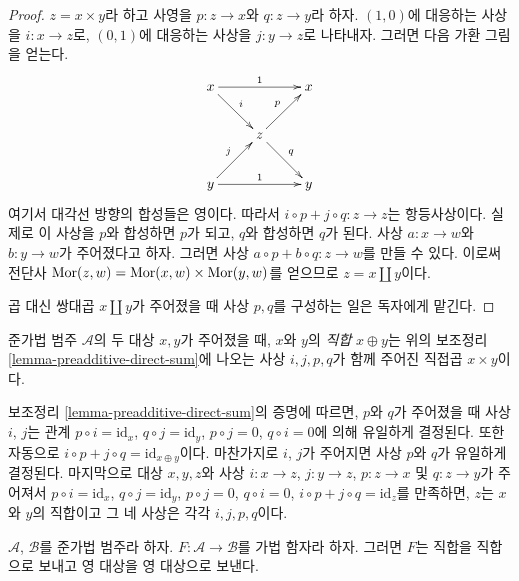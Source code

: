 \begin{proof}
$z = x \times y$라 하고 사영을 $p : z \to x$와 $q : z \to y$라 하자.
$(1, 0)$에 대응하는 사상을 $i : x \to z$로, $(0, 1)$에 대응하는 사상을
$j : y \to z$로 나타내자. 그러면 다음 가환 그림을 얻는다.
$$
\xymatrix{
x \ar[rr]^1 \ar[rd]^i & & x \\
& z \ar[ru]^p \ar[rd]^q & \\
y \ar[rr]^1 \ar[ru]^j & & y
}
$$
여기서 대각선 방향의 합성들은 영이다. 따라서
$i \circ p + j \circ q : z \to z$는 항등사상이다. 실제로 이 사상을
$p$와 합성하면 $p$가 되고, $q$와 합성하면 $q$가 된다.
사상 $a : x \to w$와 $b : y \to w$가 주어졌다고 하자.
그러면 사상 $a \circ p + b \circ q : z \to w$를 만들 수 있다.
이로써 전단사 $\mathop{\mathrm{Mor}}\nolimits(z, w) = \mathop{\mathrm{Mor}}\nolimits(x, w) \times \mathop{\mathrm{Mor}}\nolimits(y, w)$를 얻으므로
$z = x \amalg y$이다.

\medskip\noindent
곱 대신 쌍대곱 $x \amalg y$가 주어졌을 때 사상 $p, q$를 구성하는 일은
독자에게 맡긴다.
\end{proof}

\begin{definition}
\label{definition-direct-sum}
준가법 범주 $\mathcal{A}$의 두 대상 $x, y$가 주어졌을 때, $x$와 $y$의
{\it 직합} $x \oplus y$는 위의 보조정리
\ref{lemma-preadditive-direct-sum}에 나오는 사상 $i, j, p, q$가 함께 주어진
직접곱 $x \times y$이다.
\end{definition}

\begin{remark}
\label{remark-direct-sum}
보조정리 \ref{lemma-preadditive-direct-sum}의 증명에 따르면, $p$와 $q$가
주어졌을 때 사상 $i$, $j$는 관계 $p \circ i = \text{id}_x$,
$q \circ j = \text{id}_y$, $p \circ j = 0$, $q \circ i = 0$에 의해
유일하게 결정된다. 또한 자동으로
$i \circ p + j \circ q = \text{id}_{x \oplus y}$이다.
마찬가지로 $i$, $j$가 주어지면 사상 $p$와 $q$가 유일하게 결정된다.
마지막으로 대상 $x, y, z$와 사상
$i : x \to z$, $j : y \to z$, $p : z \to x$ 및
$q : z \to y$가 주어져서 $p \circ i = \text{id}_x$,
$q \circ j = \text{id}_y$, $p \circ j = 0$, $q \circ i = 0$,
$i \circ p + j \circ q = \text{id}_z$를 만족하면, $z$는 $x$와 $y$의
직합이고 그 네 사상은 각각 $i, j, p, q$이다.
\end{remark}

\begin{lemma}
\label{lemma-additive-additive}
$\mathcal{A}$, $\mathcal{B}$를 준가법 범주라 하자.
$F : \mathcal{A} \to \mathcal{B}$를 가법 함자라 하자.
그러면 $F$는 직합을 직합으로 보내고 영 대상을 영 대상으로 보낸다.
\end{lemma}

